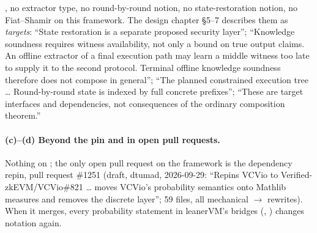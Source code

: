 \begin{itemize}
  , no extractor type, no round-by-round notion, no
  state-restoration notion, no Fiat--Shamir on this framework. The design chapter
   §5--7 describes them as \emph{targets}: ``State
  restoration is a separate proposed security layer''; ``Knowledge soundness requires witness
  availability, not only a bound on true output claims. An offline extractor of a final
  execution path may learn a middle witness too late to supply it to the second protocol.
  Terminal offline knowledge soundness therefore does not compose in general''; ``The planned
  constrained execution tree \ldots{} Round-by-round state is indexed by full concrete
  prefixes''; ``These are target interfaces and dependencies, not consequences of the ordinary
  composition theorem.''
\end{itemize}

\paragraph{(c)--(d) Beyond the pin and in open pull requests.}
Nothing on ; the only open pull request on the framework is the dependency
repin, pull request \#1251 (draft, dtumad, 2026-09-29: ``Repins VCVio to
Verified-zkEVM/VCVio\#821 \ldots{} moves VCVio's probability semantics onto Mathlib measures and
removes the discrete layer''; 59 files, all mechanical  $\to$
 rewrites). When it merges, every probability statement in leanerVM's
bridges (, ) changes
notation again.

